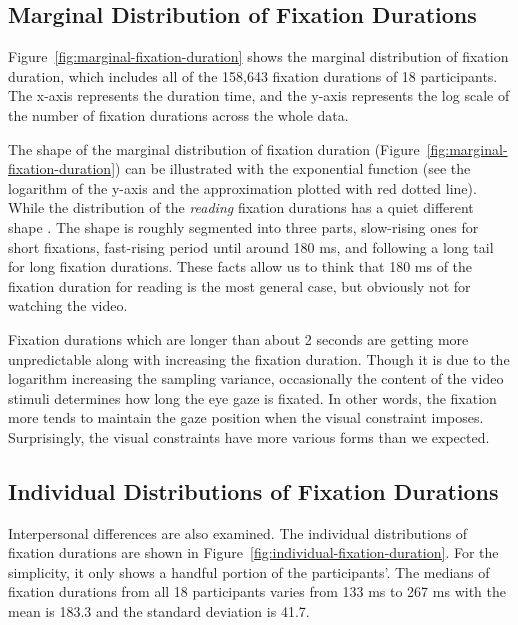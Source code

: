 \documentclass[10pt,letterpaper]{article}
\begin{document}
\subsection{Marginal Distribution of Fixation Durations}

Figure~\ref{fig:marginal-fixation-duration} shows the marginal distribution of fixation duration, which includes all of the 158,643 fixation durations of 18 participants. The x-axis represents the duration time, and the y-axis represents the log scale of the number of fixation durations across the whole data.

The shape of the marginal distribution of fixation duration (Figure~\ref{fig:marginal-fixation-duration}) can be illustrated with the exponential function (see the logarithm of the y-axis and the approximation plotted with red dotted line). While the distribution of the \textit{reading} fixation durations has a quiet different shape \cite{Feng2006}. The shape is roughly segmented into three parts, slow-rising ones for short fixations, fast-rising period until around 180 ms, and following a long tail for long fixation durations. These facts allow us to think that 180 ms of the fixation duration for reading is the most general case, but obviously not for watching the video.

Fixation durations which are longer than about 2 seconds are getting more unpredictable along with increasing the fixation duration. Though it is due to the logarithm increasing the sampling variance, occasionally the content of the video stimuli determines how long the eye gaze is fixated. In other words, the fixation more tends to maintain the gaze position when the visual constraint imposes. Surprisingly, the visual constraints have more various forms than we expected.

\subsection{Individual Distributions of Fixation Durations}

Interpersonal differences are also examined. The individual distributions of fixation durations are shown in Figure~\ref{fig:individual-fixation-duration}. For the simplicity, it only shows a handful portion of the participants'. The medians of fixation durations from all 18 participants varies from 133 ms to 267 ms with the mean is 183.3 and the standard deviation is 41.7.
\end{document}

